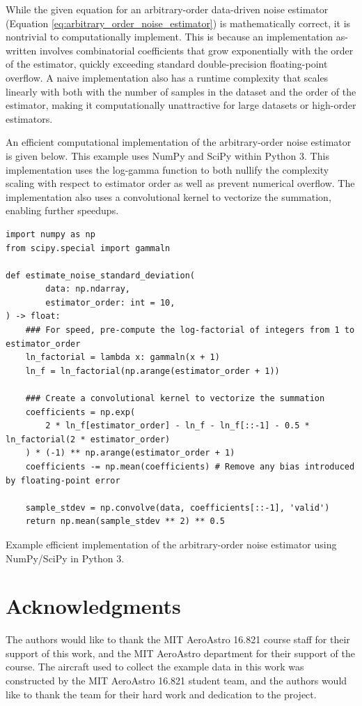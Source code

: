 \documentclass[conf]{new-aiaa}
\begin{document}
    While the given equation for an arbitrary-order data-driven noise estimator (Equation \ref{eq:arbitrary_order_noise_estimator}) is mathematically correct, it is nontrivial to computationally implement. This is because an implementation as-written involves combinatorial coefficients that grow exponentially with the order of the estimator, quickly exceeding standard double-precision floating-point overflow. A naive implementation also has a runtime complexity that scales linearly with both with the number of samples in the dataset and the order of the estimator, making it computationally unattractive for large datasets or high-order estimators.

    An efficient computational implementation of the arbitrary-order noise estimator is given below. This example uses NumPy and SciPy within Python 3. This implementation uses the log-gamma function to both nullify the complexity scaling with respect to estimator order as well as prevent numerical overflow. The implementation also uses a convolutional kernel to vectorize the summation, enabling further speedups.

    \begin{listing}[H]
        \begin{verbatim}
import numpy as np
from scipy.special import gammaln

def estimate_noise_standard_deviation(
        data: np.ndarray,
        estimator_order: int = 10,
) -> float:
    ### For speed, pre-compute the log-factorial of integers from 1 to estimator_order
    ln_factorial = lambda x: gammaln(x + 1)
    ln_f = ln_factorial(np.arange(estimator_order + 1))

    ### Create a convolutional kernel to vectorize the summation
    coefficients = np.exp(
        2 * ln_f[estimator_order] - ln_f - ln_f[::-1] - 0.5 * ln_factorial(2 * estimator_order)
    ) * (-1) ** np.arange(estimator_order + 1)
    coefficients -= np.mean(coefficients) # Remove any bias introduced by floating-point error

    sample_stdev = np.convolve(data, coefficients[::-1], 'valid')
    return np.mean(sample_stdev ** 2) ** 0.5

        \end{verbatim}
        \caption{Example efficient implementation of the arbitrary-order noise estimator using NumPy/SciPy in Python 3.}
        \label{listing:efficient_arbitrary_order_noise_estimator}
    \end{listing}

    \section*{Acknowledgments}
    The authors would like to thank the MIT AeroAstro 16.821 course staff for their support of this work, and the MIT AeroAstro department for their support of the course. The aircraft used to collect the example data in this work was constructed by the MIT AeroAstro 16.821 student team, and the authors would like to thank the team for their hard work and dedication to the project.

    
\end{document}
